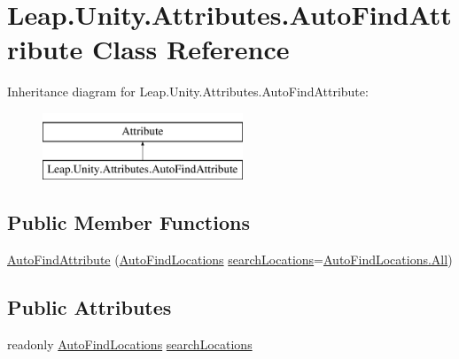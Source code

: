\hypertarget{class_leap_1_1_unity_1_1_attributes_1_1_auto_find_attribute}{}\section{Leap.\+Unity.\+Attributes.\+Auto\+Find\+Attribute Class Reference}
\label{class_leap_1_1_unity_1_1_attributes_1_1_auto_find_attribute}
Inheritance diagram for Leap.\+Unity.\+Attributes.\+Auto\+Find\+Attribute\+:\begin{figure}[H]
\begin{center}
\leavevmode
\includegraphics[height=2.000000cm]{class_leap_1_1_unity_1_1_attributes_1_1_auto_find_attribute}
\end{center}
\end{figure}
\subsection*{Public Member Functions}
\begin{DoxyCompactItemize}
\item 
\mbox{\hyperlink{class_leap_1_1_unity_1_1_attributes_1_1_auto_find_attribute_a06538026a078205b4f90e2bdd33dd9f4}{Auto\+Find\+Attribute}} (\mbox{\hyperlink{namespace_leap_1_1_unity_1_1_attributes_a4b8f0ac9a7b74b480178dc5fb4069a89}{Auto\+Find\+Locations}} \mbox{\hyperlink{class_leap_1_1_unity_1_1_attributes_1_1_auto_find_attribute_a5cbc7323b8b48735cc539732cb9626f4}{search\+Locations}}=\mbox{\hyperlink{namespace_leap_1_1_unity_1_1_attributes_a4b8f0ac9a7b74b480178dc5fb4069a89ab1c94ca2fbc3e78fc30069c8d0f01680}{Auto\+Find\+Locations.\+All}})
\end{DoxyCompactItemize}
\subsection*{Public Attributes}
\begin{DoxyCompactItemize}
\item 
readonly \mbox{\hyperlink{namespace_leap_1_1_unity_1_1_attributes_a4b8f0ac9a7b74b480178dc5fb4069a89}{Auto\+Find\+Locations}} \mbox{\hyperlink{class_leap_1_1_unity_1_1_attributes_1_1_auto_find_attribute_a5cbc7323b8b48735cc539732cb9626f4}{search\+Locations}}
\end{DoxyCompactItemize}


